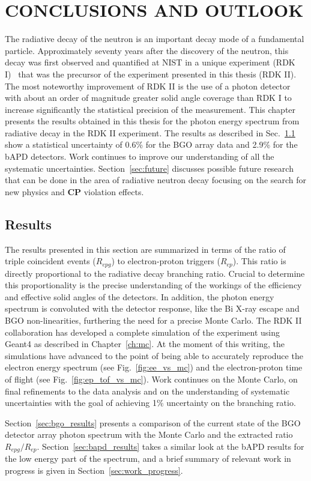 \documentclass[oneside,12pt]{memoir}
\begin{document}
\chapter{CONCLUSIONS AND OUTLOOK}
\label{ch:conclusion}
The radiative decay of the neutron is an important decay mode of a fundamental particle. Approximately seventy years after the discovery of the neutron, this decay was first observed and quantified at NIST in a unique experiment (RDK I)~\cite{rdk1nature,rdk1prc} that was the precursor of the experiment presented in this thesis (RDK II). The most noteworthy improvement of RDK II is the use of a photon detector with about an order of magnitude greater solid angle coverage than RDK I  to increase significantly the statistical precision of the measurement. This chapter presents the results obtained in this thesis for the photon energy spectrum from radiative decay in the RDK II experiment. The results as described in Sec.~\ref{sec:results} show a statistical uncertainty of 0.6\% for the BGO array data and 2.9\% for the bAPD detectors. Work continues to improve our understanding of all the systematic uncertainties. Section~\ref{sec:future} discusses possible future research that can be done in the area of radiative neutron decay focusing on the search for new physics and $\mathbf{CP}$ violation effects.

\section{Results}
\label{sec:results}
The results presented in this section are summarized in terms of the ratio of triple coincident events ($R_{epg}$) to electron-proton triggers ($R_{ep}$). This ratio is directly proportional to the radiative decay branching ratio. Crucial to determine this proportionality is the precise understanding of the workings of the efficiency and effective solid angles of the detectors. In addition, the photon energy spectrum is convoluted with the detector response, like the Bi X-ray escape and BGO non-linearities, furthering the need for a precise Monte Carlo. The RDK II collaboration has developed a complete simulation of the experiment using Geant4 as described in Chapter~\ref{ch:mc}. At the moment of this writing, the simulations have advanced to the point of being able to accurately reproduce the electron energy spectrum (see Fig.~\ref{fig:ee_vs_mc}) and the electron-proton time of flight (see Fig.~\ref{fig:ep_tof_vs_mc}). Work continues on the Monte Carlo, on final refinements to the data analysis and on the understanding of systematic uncertainties with the goal of achieving 1\% uncertainty on the branching ratio.\par
Section~\ref{sec:bgo_results} presents a comparison of the current state of the BGO detector array photon spectrum with the Monte Carlo and the extracted ratio $R_{epg}/R_{ep}$. Section~\ref{sec:bapd_results} takes a similar look at the bAPD results for the low energy part of the spectrum, and a brief summary of relevant work in progress is given in Section~\ref{sec:work_progress}.
\end{document}
